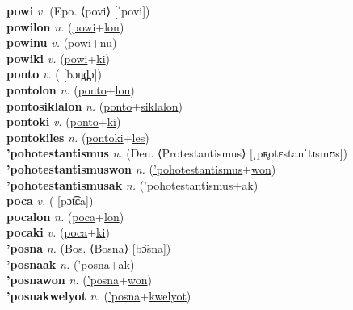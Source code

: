 \textbf{powi} \textit{v.} (Epo. ⟨povi⟩ [ˈpovi])
 \label{powi} \\
\textbf{powilon} \textit{n.} (\hyperref[powi]{powi}+\hyperref[lon]{lon})
 \label{powilon} \\
\textbf{powinu} \textit{v.} (\hyperref[powi]{powi}+\hyperref[nu]{nu})
 \label{powinu} \\
\textbf{powiki} \textit{v.} (\hyperref[powi]{powi}+\hyperref[ki]{ki})
 \label{powiki} \\
\textbf{ponto} \textit{v.} ( [bɔn̪d̪̤ɔ])
 \label{ponto} \\
\textbf{pontolon} \textit{n.} (\hyperref[ponto]{ponto}+\hyperref[lon]{lon})
 \label{pontolon} \\
\textbf{pontosiklalon} \textit{n.} (\hyperref[ponto]{ponto}+\hyperref[siklalon]{siklalon})
 \label{pontosiklalon} \\
\textbf{pontoki} \textit{v.} (\hyperref[ponto]{ponto}+\hyperref[ki]{ki})
 \label{pontoki} \\
\textbf{pontokiles} \textit{n.} (\hyperref[pontoki]{pontoki}+\hyperref[les]{les})
 \label{pontokiles} \\
\textbf{'pohotestantismus} \textit{n.} (Deu. ⟨Protestantismus⟩ [ˌpʀ̥otɛstanˈtɪsmʊs])
 \label{'pohotestantismus} \\
\textbf{'pohotestantismuswon} \textit{n.} (\hyperref['pohotestantismus]{'pohotestantismus}+\hyperref[won]{won})
 \label{'pohotestantismuswon} \\
\textbf{'pohotestantismusak} \textit{n.} (\hyperref['pohotestantismus]{'pohotestantismus}+\hyperref[ak]{ak})
 \label{'pohotestantismusak} \\
\textbf{poca} \textit{v.} ( [pɔt͡ɕa])
 \label{poca} \\
\textbf{pocalon} \textit{n.} (\hyperref[poca]{poca}+\hyperref[lon]{lon})
 \label{pocalon} \\
\textbf{pocaki} \textit{v.} (\hyperref[poca]{poca}+\hyperref[ki]{ki})
 \label{pocaki} \\
\textbf{'posna} \textit{n.} (Bos. ⟨Bosna⟩ [bɔ̂sna])
 \label{'posna} \\
\textbf{'posnaak} \textit{n.} (\hyperref['posna]{'posna}+\hyperref[ak]{ak})
 \label{'posnaak} \\
\textbf{'posnawon} \textit{n.} (\hyperref['posna]{'posna}+\hyperref[won]{won})
 \label{'posnawon} \\
\textbf{'posnakwelyot} \textit{n.} (\hyperref['posna]{'posna}+\hyperref[kwelyot]{kwelyot})
 \label{'posnakwelyot} \\
